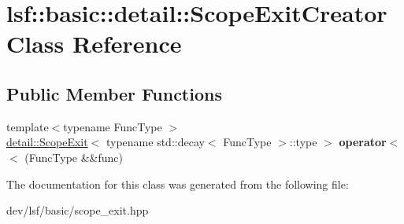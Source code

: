 \hypertarget{classlsf_1_1basic_1_1detail_1_1ScopeExitCreator}{
\section{lsf::basic::detail::ScopeExitCreator Class Reference}
\label{classlsf_1_1basic_1_1detail_1_1ScopeExitCreator}
}
\subsection*{Public Member Functions}
\begin{DoxyCompactItemize}
\item 
\hypertarget{classlsf_1_1basic_1_1detail_1_1ScopeExitCreator_a77e99e52067791f34edfa2d3e9a9d48a}{
{\footnotesize template$<$typename FuncType $>$ }\\\hyperlink{classlsf_1_1basic_1_1detail_1_1ScopeExit}{detail::ScopeExit}$<$ typename std::decay$<$ FuncType $>$::type $>$ {\bfseries operator$<$$<$} (FuncType \&\&func)}
\label{classlsf_1_1basic_1_1detail_1_1ScopeExitCreator_a77e99e52067791f34edfa2d3e9a9d48a}

\end{DoxyCompactItemize}


The documentation for this class was generated from the following file:\begin{DoxyCompactItemize}
\item 
dev/lsf/basic/scope\_\-exit.hpp\end{DoxyCompactItemize}
